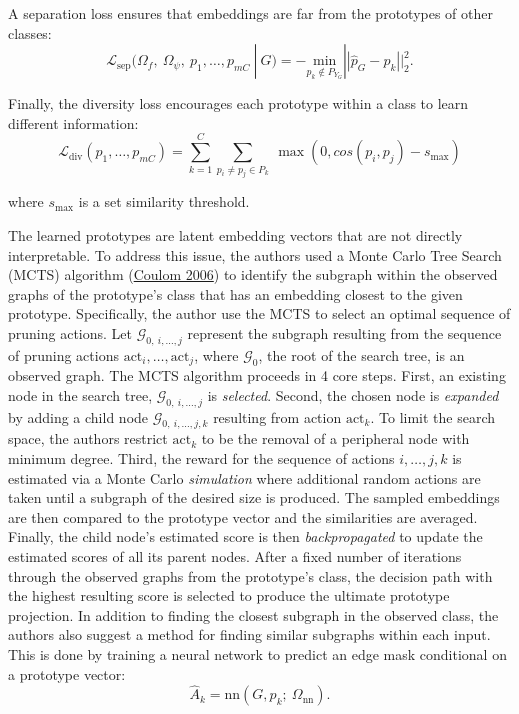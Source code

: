 \documentclass[
  11pt,
  letterpaper,
]{article}
\begin{document}
A separation loss ensures that embeddings are far from the prototypes of
other classes: \begin{equation}
    \mathcal{L}_{\text{sep}}(\Omega_f, \ \Omega_\psi, \ p_1, \dots, p_{mC} \ | \ G) = - \underset{p_k \notin P_{Y_G}}{\text{min}} || \hat p_G - p_k ||^2_2. 
\end{equation}

Finally, the diversity loss encourages each prototype within a class to
learn different information:\\
\begin{equation}
    \mathcal{L}_{\text{div}}(p_1, \dots, p_{mC}) = \sum_{k=1}^C \sum_{p_i \neq p_j \in P_k} \ \max(0, cos(p_i, p_j) - s_\text{max})
\end{equation}

where \(s_\text{max}\) is a set similarity threshold.

\quad The learned prototypes are latent embedding vectors that are not
directly interpretable. To address this issue, the authors used a Monte
Carlo Tree Search (MCTS) algorithm
(\protect\hyperlink{ref-Coulom2006EfficientSA}{Coulom 2006}) to identify
the subgraph within the observed graphs of the prototype's class that
has an embedding closest to the given prototype. Specifically, the
author use the MCTS to select an optimal sequence of pruning actions.
Let \(\mathcal{G}_{0, \ i, \dots, j}\) represent the subgraph resulting
from the sequence of pruning actions
\(\text{act}_i,\dots, \text{act}_j\), where \(\mathcal{G}_0\), the root
of the search tree, is an observed graph. The MCTS algorithm proceeds in
4 core steps. First, an existing node in the search tree,
\(\mathcal{G}_{0, \ i, \dots, j}\) is \emph{selected}. Second, the
chosen node is \emph{expanded} by adding a child node
\(\mathcal{G}_{0, \ i, \dots, j, k}\) resulting from action
\(\text{act}_k\). To limit the search space, the authors restrict
\(\text{act}_k\) to be the removal of a peripheral node with minimum
degree. Third, the reward for the sequence of actions \(i, \dots, j, k\)
is estimated via a Monte Carlo \emph{simulation} where additional random
actions are taken until a subgraph of the desired size is produced. The
sampled embeddings are then compared to the prototype vector and the
similarities are averaged. Finally, the child node's estimated score is
then \emph{backpropagated} to update the estimated scores of all its
parent nodes. After a fixed number of iterations through the observed
graphs from the prototype's class, the decision path with the highest
resulting score is selected to produce the ultimate prototype
projection. In addition to finding the closest subgraph in the observed
class, the authors also suggest a method for finding similar subgraphs
within each input. This is done by training a neural network to predict
an edge mask conditional on a prototype vector:\\
\begin{equation}
    \hat A_k = \text{nn}\left(G, p_k; \ \Omega_{\text{nn}}\right).  
\end{equation}
\end{document}
